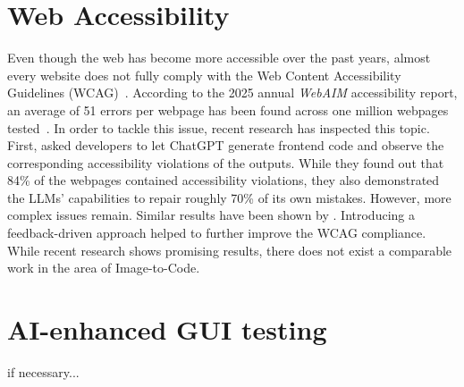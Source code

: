 \section{Web Accessibility}
Even though the web has become more accessible over the past years, almost every website 
does not fully comply with the Web Content Accessibility Guidelines 
(WCAG)~\parencite{wcag22}. According to the 2025 annual \textit{WebAIM}
accessibility report, an average of 51 errors per webpage has been 
found across one million webpages tested~\parencite{webaim2025million}.
In order to tackle this issue, recent research has inspected this topic.
First, \textcite{aljedaani2024chatgpt}
asked developers to let ChatGPT generate frontend code and observe 
the corresponding accessibility violations of the outputs. While they 
found out that 84\% of the webpages contained accessibility violations,
they also demonstrated the LLMs' capabilities to repair roughly 
70\% of its own mistakes. However, more complex issues remain. 
Similar results have been shown by \textcite{suh2025accessiblecode}.
Introducing a feedback-driven approach helped to further improve 
the WCAG compliance.\newline
While recent research shows promising results, there does not exist 
a comparable work in the area of Image-to-Code. 


\section{AI-enhanced GUI testing}
if necessary...
